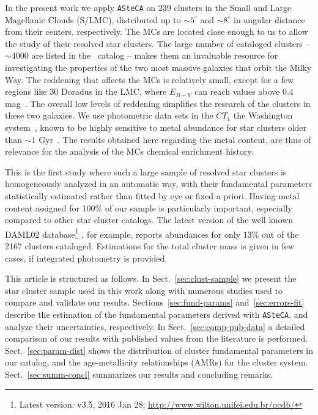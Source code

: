\documentclass{aa}
\begin{document}
In the present work we apply \texttt{ASteCA} on 239 clusters in the Small and
Large Magellanic Clouds (S/LMC), distributed up to ${\sim}5^{\circ}$ and $
{\sim}8^{\circ}$ in angular distance from their centers, respectively.
%
The MCs are located close enough to us to allow the study of their resolved star
clusters. The large number of cataloged clusters -- $\sim4000$ are listed in
the~\cite{Bica_2008} catalog -- makes them an invaluable resource for
investigating the properties of the two most massive galaxies that orbit the
Milky Way.
%
The reddening that affects the MCs is relatively small, except for a few regions
like 30 Doradus in the LMC, where $E_{B-V}$ can reach values above $0.4$
mag~\citep{Piatti_2015b}. The overall low levels of reddening simplifies
the research of the clusters in these two galaxies.
%
We use photometric data sets in the $CT_1$ the Washington
system~\citep{Canterna_1976,Geisler_1996}, known to be highly sensitive
to metal abundance for star clusters older than ${\sim}1$
Gyr~\citep{Geisler_1999}.
The results obtained here regarding the metal content, are thus of relevance for
the analysis of the MCs chemical enrichment history.

This is the first study where such a large sample of resolved star clusters is
homogeneously analyzed in an automatic way, with their fundamental
parameters statistically estimated rather than fitted by eye or fixed a priori.
%
Having metal content assigned for 100\% of our sample is particularly
important, especially compared to other star cluster catalogs. The latest
version of the well known DAML02 database\footnote{Latest version: v3.5, 2016
Jan 28; \url{http://www.wilton.unifei.edu.br/ocdb/}}
\citep{Dias_2002}, for example, reports abundances for only 13\% out of the 2167
clusters cataloged. Estimations for the total cluster mass is given in few
cases, if integrated photometry is provided.

This article is structured as follows.
In Sect.~\ref{sec:clust-sample} we present the star cluster sample used in
this work along with numerous studies used to compare and validate our
results.
Sections~\ref{sec:fund-params} and~\ref{sec:errors-fit} describe the estimation
of the fundamental parameters derived with \texttt{ASteCA}, and analyze their
uncertainties, respectively.
In Sect.~\ref{sec:comp-pub-data} a detailed comparison of our results with
published values from the literature is performed.
Sect.~\ref{sec:param-dist} shows the distribution of cluster fundamental
parameters in our catalog, and the age-metallicity relationships (AMRs) for the
cluster system.
Sect.~\ref{sec:summ-concl} summarizes our results and concluding remarks.
\end{document}
